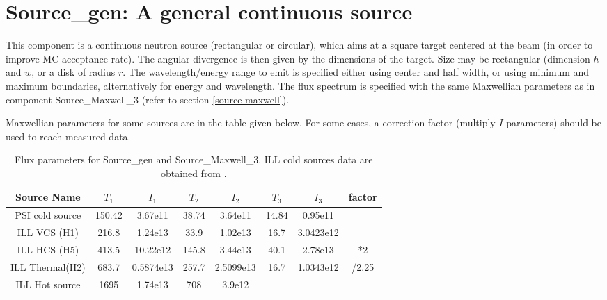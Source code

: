 \section{Source\_gen: A general continuous source}
\label{source-gen}


This component is a continuous neutron source (rectangular or circular), which aims at
a square target centered at the beam (in order to improve MC-acceptance
rate). The angular divergence is then given by the dimensions of the
target. Size may be rectangular (dimension $h$ and $w$, or a disk of radius $r$. The wavelength/energy range to emit is specified either using center and half width, or using minimum and maximum boundaries, alternatively for energy and wavelength.
The flux spectrum is specified with the same Maxwellian parameters as in component Source\_Maxwell\_3 (refer to section \ref{source-maxwell}).

Maxwellian parameters for some sources are in the table given below. For some cases, a correction factor (multiply $I$ parameters) should be used to reach measured data.

\begin{table}
  \begin{center}
  {\let\my=\\
    \begin{tabular}{cccccccc}
    \hline
    Source Name & $T_1$ & $I_1$ & $T_2$ & $I_2$ & $T_3$ & $I_3$ & factor \\
    \hline
    PSI cold source & 150.42 & 3.67e11   & 38.74 & 3.64e11    & 14.84& 0.95e11    &\\
    ILL VCS (H1)    & 216.8  & 1.24e13  & 33.9  & 1.02e13   & 16.7 & 3.0423e12 &\\
    ILL HCS (H5)    & 413.5  & 10.22e12  & 145.8 & 3.44e13    & 40.1 & 2.78e13    & *2\\
    ILL Thermal(H2) & 683.7  & 0.5874e13& 257.7 & 2.5099e13 & 16.7 & 1.0343e12 & /2.25\\
    ILL Hot source  & 1695   & 1.74e13   & 708   & 3.9e12     &      &            &\\
    \end{tabular}
    \caption{Flux parameters for Source\_gen and Source\_Maxwell\_3. ILL cold sources data are obtained from \cite{Ageron89}.}
    \label{t:source-params}
  }
  \end{center}
\end{table}